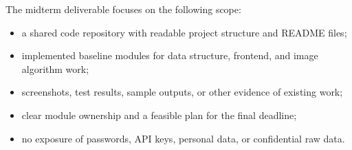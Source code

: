 The midterm deliverable focuses on the following scope:

\begin{itemize}
  \item a shared code repository with readable project structure and README files;
  \item implemented baseline modules for data structure, frontend, and image algorithm work;
  \item screenshots, test results, sample outputs, or other evidence of existing work;
  \item clear module ownership and a feasible plan for the final deadline;
  \item no exposure of passwords, API keys, personal data, or confidential raw data.
\end{itemize}

